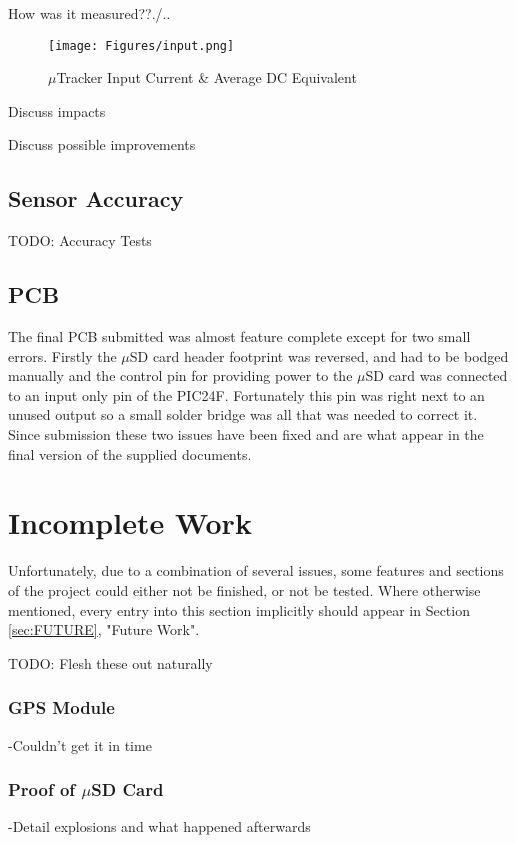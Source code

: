 \documentclass[12pt,openany,a4paper]{book}
\begin{document}
		How was it measured??./..
			\begin{figure}[H]
				\centering
				\texttt{[image: Figures/input.png]}
				\caption{$\mu$Tracker Input Current \& Average DC Equivalent}
				\label{fig:input}
			\end{figure}	
			
		Discuss impacts
		
		Discuss possible improvements
			
		\subsection{Sensor Accuracy}
		TODO: Accuracy Tests
		
		\subsection{PCB} \label{sec:PCBERROR}
		The final PCB submitted was almost feature complete except for two small errors. Firstly the $\mu$SD card header footprint was reversed, and had to be bodged manually and the control pin for providing power to the $\mu$SD card was connected to an input only pin of the PIC24F. Fortunately this pin was right next to an unused output so a small solder bridge was all that was needed to correct it. \\
		
		Since submission these two issues have been fixed and are what appear in the final version of the supplied documents. \\
		
	\section{Incomplete Work}
	Unfortunately, due to a combination of several issues, some features and sections of the project could either not be finished, or not be tested. Where otherwise mentioned, every entry into this section implicitly  should appear in Section \ref{sec:FUTURE}, "Future Work".
	
	TODO: Flesh these out naturally
	\subsubsection{GPS Module}
		-Couldn't get it in time\\
	\subsubsection{Proof of $\mu$SD Card}
		-Detail explosions and what happened afterwards\\
\end{document}
